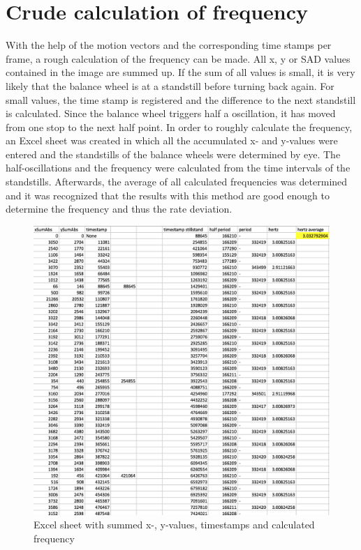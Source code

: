 \documentclass[12pt, a4paper]{report}
\begin{document}
    \section{Crude calculation of frequency}
    With the help of the motion vectors and the corresponding time stamps per frame, a rough calculation of the frequency can be made. All x, y or SAD values contained in the image are summed up. If the sum of all values is small, it is very likely that the balance wheel is at a standstill before turning back again. For small values, the time stamp is registered and the difference to the next standstill is calculated. Since the balance wheel triggers half a oscillation, it has moved from one stop to the next half point. 
    In order to roughly calculate the frequency, an Excel sheet was created in which all the accumulated x- and y-values were entered and the standstills of the balance wheels were determined by eye. The half-oscillations and the frequency were calculated from the time intervals of the standstills. Afterwards, the average of all calculated frequencies was determined and it was recognized that the results with this method are good enough to determine the frequency and thus the rate deviation. 
    
    \noindent
    \begin{figure}[H]
    \centering
    \includegraphics[scale=0.7]{Images/excel_sheet_numbers.png}
    
    \caption{Excel sheet with summed x-, y-values, timestamps and calculated frequency}
    \end{figure}
\end{document}
